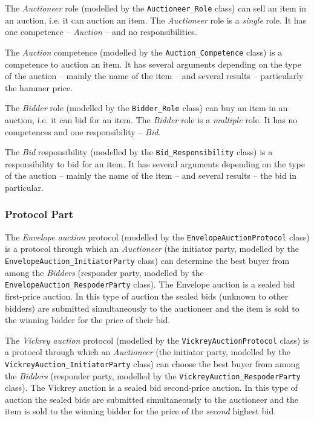The \textit{Auctioneer} role (modelled by the \texttt{Auctioneer\_Role} class) can sell an item in an auction, i.e. it can auction an item.
The \textit{Auctioneer} role is a \textit{single} role.
It has one competence -- \textit{Auction} -- and no responsibilities.

The \textit{Auction} competence (modelled by the \texttt{Auction\_Competence} class) is a competence to auction an item.
It has several arguments depending on the type of the auction -- mainly the name of the item -- and several results -- particularly the hammer price.

The \textit{Bidder} role (modelled by the \texttt{Bidder\_Role} class) can buy an item in an auction, i.e. it can bid for an item. 
The \textit{Bidder} role is a \textit{multiple} role.
It has no competences and one responsibility -- \textit{Bid}.

The \textit{Bid} responsibility (modelled by the \texttt{Bid\_Responsibility} class) is a responsibility to bid for an item.
It has several arguments depending on the type of the auction -- mainly the name of the item -- and several results -- the bid in particular.

\subsubsection*{Protocol Part}

The \textit{Envelope auction} protocol (modelled by the \texttt{EnvelopeAuctionProtocol} class) is a protocol through which an \textit{Auctioneer} (the initiator party, modelled by the \texttt{EnvelopeAuction\_InitiatorParty} class) can determine the best buyer from among the \textit{Bidders} (responder party, modelled by the \texttt{EnvelopeAuction\_RespoderParty} class).
The Envelope auction is a sealed bid first-price auction.
In this type of auction the sealed bids (unknown to other bidders) are submitted simultaneously to the auctioneer and the item is sold to the winning bidder for the price of their bid.

The \textit{Vickrey auction} protocol (modelled by the \texttt{VickreyAuctionProtocol} class) is a protocol through which an \textit{Auctioneer} (the initiator party, modelled by the \texttt{VickreyAuction\_InitiatorParty} class) can choose the best buyer from among the \textit{Bidders} (responder party, modelled by the \texttt{VickreyAuction\_RespoderParty} class).
The Vickrey auction is a sealed bid second-price auction.
In this type of auction the sealed bids are submitted simultaneously to the auctioneer and the item is sold to the winning bidder for the price of the \textit{second} highest bid.

